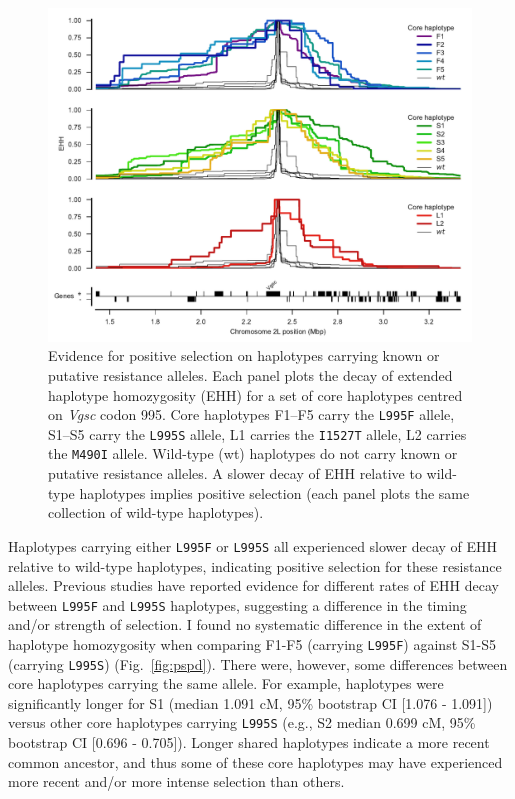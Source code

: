\documentclass[a4paper,11pt,abstracton,hidelinks]{scrartcl}
\begin{document}
\begin{figure}[t!]
\centering
\includegraphics[width=1\linewidth,center]{artwork/chapter6/ehh.pdf}
\caption{Evidence for positive selection on haplotypes carrying known or putative resistance alleles.
%
Each panel plots the decay of extended haplotype homozygosity (EHH) for a set of core haplotypes centred on \textit{Vgsc} codon 995.
%
Core haplotypes F1--F5 carry the \texttt{L995F} allele, S1--S5 carry the \texttt{L995S} allele, L1 carries the \texttt{I1527T} allele, L2 carries the \texttt{M490I} allele.
%
Wild-type (wt) haplotypes do not carry known or putative resistance alleles.
%
A slower decay of EHH relative to wild-type haplotypes implies positive selection (each panel plots the same collection of wild-type haplotypes).
}
\label{fig:ehh}
\end{figure}


Haplotypes carrying either \texttt{L995F} or \texttt{L995S} all experienced slower decay of EHH relative to wild-type haplotypes, indicating positive selection for these resistance alleles.
%
Previous studies have reported evidence for different rates of EHH decay between \texttt{L995F} and \texttt{L995S} haplotypes, suggesting a difference in the timing and/or strength of selection.
%
I found no systematic difference in the extent of haplotype homozygosity when comparing F1-F5 (carrying \texttt{L995F}) against S1-S5 (carrying \texttt{L995S}) (Fig.~\ref{fig:pspd}).
%
There were, however, some differences between core haplotypes carrying the same allele.
%
For example, haplotypes were significantly longer for S1 (median 1.091 cM, 95\% bootstrap CI [1.076 - 1.091]) versus other core haplotypes carrying \texttt{L995S} (e.g., S2 median 0.699 cM, 95\% bootstrap CI [0.696 - 0.705]).
%
Longer shared haplotypes indicate a more recent common ancestor, and thus some of these core haplotypes may have experienced more recent and/or more intense selection than others.
\end{document}
